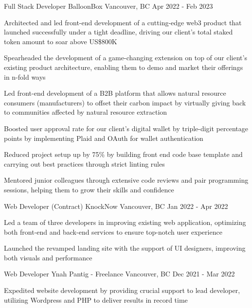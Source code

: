 
\begin{cventries}
  \cventry
    {Full Stack Developer} %
    {BalloonBox} %
    {Vancouver, BC} %
    {Apr 2022 - Feb 2023} %
    {
      \begin{cvitems} %
        \item{Architected and led front-end development of a cutting-edge web3 product that launched successfully under a tight deadline, driving our client's total staked token amount to soar above US\$800K}
        \item{Spearheaded the development of a game-changing extension on top of our client's existing product architecture, enabling them to demo and market their offerings in n-fold ways}
        \item{Led front-end development of a B2B platform that allows natural resource consumers (manufacturers) to offset their carbon impact by virtually giving back to communities affected by natural resource extraction}
        \item{Boosted user approval rate for our client's digital wallet by triple-digit percentage points by implementing Plaid and OAuth for wallet authentication}
        \item{Reduced project setup up by 75\% by building front end code base template and carrying out best practices through strict linting rules}
        \item{Mentored junior colleagues through extensive code reviews and pair programming sessions, helping them to grow their skills and confidence}
      \end{cvitems}
    }

  \cventry
    {Web Developer (Contract)} %
    {KnockNow} %
    {Vancouver, BC} %
    {Jan 2022 - Apr 2022} %
    {
      \begin{cvitems} %
        \item{Led a team of three developers in improving existing web application, optimizing both front-end and back-end services to ensure top-notch user experience}
        \item{Launched the revamped landing site with the support of UI designers, improving both visuals and performance}
      \end{cvitems}
    }

  \cventry
    {Web Developer} %
    {Ynah Pantig - Freelance} %
    {Vancouver, BC} %
    {Dec 2021 - Mar 2022} %
    {
      \begin{cvitems} %
        \item {Expedited website development by providing crucial support to lead developer, utilizing Wordpress and PHP to deliver results in record time}
      \end{cvitems}
    }


\end{cventries}
